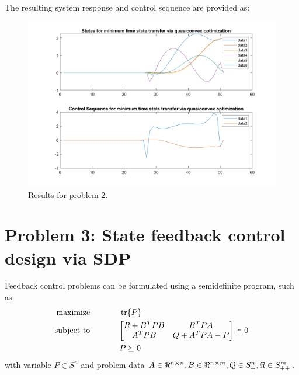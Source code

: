 \documentclass[letter]{article}
\begin{document}
\newpage
The resulting system response and control sequence are provided as:
\begin{figure}[h]
	\centering
	\includegraphics[width=1\linewidth]{fig/pblm2}
	\caption{Results for problem 2.}
	\label{fig:pblm2}
\end{figure}

\newpage
\section{Problem 3: State feedback control design via SDP}
Feedback control problems can be formulated using a semidefinite program, such as
\begin{equation}\label{eq:feedback_control_def}
	\begin{aligned}
		\text{maximize} \hspace{0.5in}& \trace \{P\}\\
		\text{subject to} \hspace{0.5in}
		& \mqty [R + B^T PB & B^T PA\\
				 A^T PB & Q + A^T P A - P] \succeq 0\\
				 & P \succeq 0
	\end{aligned}
\end{equation}
with variable $P \in S^n$ and problem data $A\in \real^{n\cross n}, B \in\real^{n\cross m}, Q \in S^n_+, \real \in S^m_{++}$.\\
\end{document}
